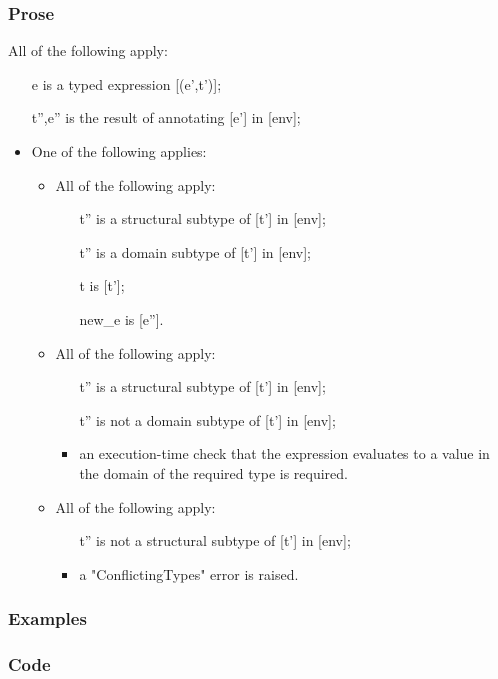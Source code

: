 \documentclass{book}
\begin{document}
  \subsubsection{Prose}
  All of the following apply:
  \begin{itemize}
  \item  [e] is a typed expression [(e',t')];
  \item  [t'',e''] is the result of annotating [e'] in [env];
  \item  One of the following applies:
    \begin{itemize}
    \item  All of the following apply:
      \begin{itemize}
      \item  [t''] is a structural subtype of [t'] in [env];
      \item  [t''] is a domain subtype of [t'] in [env];
      \item  [t] is [t'];
      \item  [new\_e] is [e''].
      \end{itemize}
    \item  All of the following apply:
      \begin{itemize}
      \item  [t''] is a structural subtype of [t'] in [env];
      \item  [t''] is not a domain subtype of [t'] in [env];
      \item  an execution-time check that the expression evaluates to a value in the
        domain of the required type is required.
      \end{itemize}
   \item  All of the following apply:
     \begin{itemize}
     \item  [t''] is not a structural subtype of [t'] in [env];
     \item  a "ConflictingTypes" error is raised.
     \end{itemize}
   \end{itemize}
  \end{itemize}

  \subsubsection{Examples}

  \subsubsection{Code}
\end{document}
